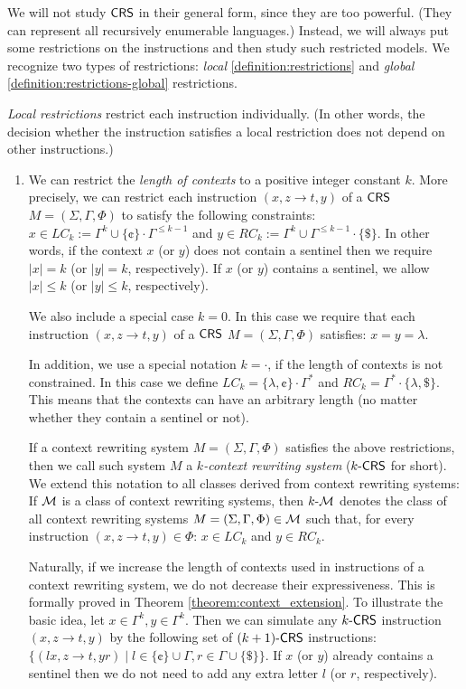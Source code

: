 We will not study $\CRS$ in their general form, since they are too powerful. (They can represent all recursively enumerable languages.) Instead, we will always put some restrictions on the instructions and then study such restricted models. We recognize two types of restrictions: \emph{local} \ref{definition:restrictions} and \emph{global} \ref {definition:restrictions-global} restrictions.

\begin{definition}\label{definition:restrictions}
\emph{Local restrictions} restrict each instruction individually. (In other words, the decision whether the instruction satisfies a local restriction does not depend on other instructions.)
\begin{enumerate}
\item\label{restriction:contexts}
We can restrict the \emph{length of contexts} to a positive integer constant $k$. More precisely, we can restrict each instruction $(x, z \to t, y)$ of a $\CRS$ $M=(\Sigma, \Gamma, \Phi)$ to satisfy the following constraints: $x \in LC_k := \Gamma^k \cup \{\cent\}\cdot\Gamma^{\le k-1}$ and $y \in RC_k := \Gamma^k \cup \Gamma^{\le k-1}\cdot\{\$\}$. In other words, if the context $x$ (or $y$) does not contain a sentinel then we require $|x| = k$ (or $|y| = k$, respectively). If $x$ (or $y$) contains a sentinel, we allow $|x| \le k$ (or $|y| \le k$, respectively).

We also include a special case $k = 0$. In this case we require that each instruction $(x, z \to t, y)$ of a $\CRS$ $M=(\Sigma, \Gamma, \Phi)$ satisfies: $x = y = \lambda$.

In addition, we use a special notation $k = \cdot$, if the length of contexts is not constrained. In this case we define $LC_k = \{\lambda, \cent\} \cdot \Gamma^*$ and $RC_k = \Gamma^* \cdot \{\lambda, \$\}$. This means that the contexts can have an arbitrary length (no matter whether they contain a sentinel or not).

If a context rewriting system $M=(\Sigma, \Gamma, \Phi)$ satisfies the above restrictions, then we call such system $M$ a \emph{$k$-context rewriting system} ($\kCRS$ for short). We extend this notation to all classes derived from context rewriting systems: If $\calM$ is a class of context rewriting systems, then $\kcalM$ denotes the class of all context rewriting systems $M=(\Sigma, \Gamma, \Phi) \in \calM$ such that, for every instruction $(x, z \to t, y) \in \Phi$: $x \in LC_k$ and $y \in RC_k$.

Naturally, if we increase the length of contexts used in instructions of a context rewriting system, we do not decrease their expressiveness. This is formally proved in Theorem \ref{theorem:context_extension}. To illustrate the basic idea, let $x \in \Gamma^k, y \in \Gamma^k$. Then we can simulate any $\kCRS$ instruction $(x, z \to t, y)$ by the following set of $\kCRS[(k+1)]$ instructions: $\{ (lx, z \to t, yr) \mid l \in \{\cent\} \cup \Gamma, r \in \Gamma \cup \{\$\} \}$. If $x$ (or $y$) already contains a sentinel then we do not need to add any extra letter $l$ (or $r$, respectively).


\end{enumerate}
\end{definition}
